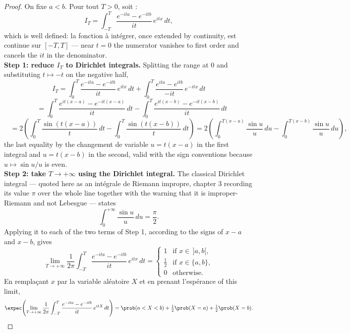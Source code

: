 \begin{proof}
On fixe $a < b$. Pour tout $T > 0$, soit :
\[
  I_{T} = \int_{-T}^{T} \frac{e^{-ita} - e^{-itb}}{it}\,e^{itx}\,dt,
\]
which is well defined: la fonction à intégrer, once extended by continuity, est continue sur
$[-T,T]$ --- near $t = 0$ the numerator vanishes to first order and cancels the $it$ in the
denominator.\\

\textbf{Step 1: reduce $I_{T}$ to Dirichlet integrals.} Splitting the range at $0$ and
substituting $t \mapsto -t$ on the negative half,
\[
  I_{T} = \int_{0}^{T} \frac{e^{-ita} - e^{-itb}}{it}\,e^{itx}\,dt + \int_{0}^{T}
  \frac{e^{ita} - e^{itb}}{-it}\,e^{-itx}\,dt
\]
\[
  \phantom{I_{T}} = \int_{0}^{T} \frac{e^{it(x-a)} - e^{-it(x-a)}}{it}\,dt - \int_{0}^{T}
  \frac{e^{it(x-b)} - e^{-it(x-b)}}{it}\,dt
\]
\[
  \phantom{I_{T}} = 2\left(\int_{0}^{T} \frac{\sin\!\left(t(x-a)\right)}{t}\,dt -
  \int_{0}^{T} \frac{\sin\!\left(t(x-b)\right)}{t}\,dt\right) = 2\left(\int_{0}^{T(x-a)}
  \frac{\sin u}{u}\,du - \int_{0}^{T(x-b)} \frac{\sin u}{u}\,du\right),
\]
the last equality by the changement de variable $u = t(x-a)$ in the first integral and $u =
t(x-b)$ in the second, valid with the sign conventions because $u \mapsto \sin u / u$ is
even.\\

\textbf{Step 2: take $T \to +\infty$ using the Dirichlet integral.} The classical Dirichlet
integral --- quoted here as an intégrale de Riemann impropre, chapter 3 recording its value $\pi$
over the whole line together with the warning that it is improper-Riemann and not
Lebesgue --- states
\[
  \int_{0}^{+\infty} \frac{\sin u}{u}\,du = \frac{\pi}{2}.
\]
Applying it to each of the two terms of Step 1, according to the signs of $x - a$ and $x -
b$, gives
\[
  \lim_{T \to +\infty} \frac{1}{2\pi}\int_{-T}^{T} \frac{e^{-ita} -
  e^{-itb}}{it}\,e^{itx}\,dt =
  \begin{cases} 1           & \text{if } x \in\, ]a,b[,\\[2pt]
  \tfrac{1}{2} & \text{if } x \in \{a,b\},\\[2pt] 0           & \text{otherwise.}
  \end{cases}
\]
En remplaçant $x$ par la variable aléatoire $X$ et en prenant l'espérance of this limit,
\[
  \expec\!\left(\lim_{T \to +\infty} \frac{1}{2\pi}\int_{-T}^{T} \frac{e^{-ita} -
  e^{-itb}}{it}\,e^{itX}\,dt\right) = \prob(a < X < b) + \tfrac{1}{2}\prob(X = a) +
  \tfrac{1}{2}\prob(X = b).
\]


\end{proof}
